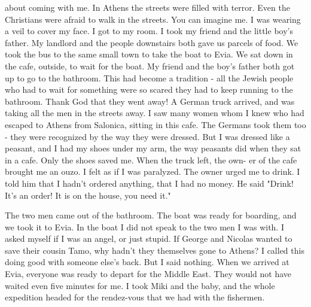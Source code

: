 about coming with me. 
In Athens the streets were filled with terror. Even the Christians 
were afraid to walk in the streets. You can imagine me. I was wearing 
a veil to cover my face. I got to my room. I took my friend and the 
little boy's father. My landlord and the people downstairs both gave 
us parcels of food. We took the bus to the same small town to take the 
boat to Evia. We sat down in the cafe, outside, to wait for the 
boat. My friend and the boy's father both got up to go to the bathroom. 
This had become a tradition - all the Jewish people who had to wait for 
something were so scared they had to keep running to the bathroom.  
Thank God that they went away! 
A German truck arrived, and was taking all the men in the streets 
away. I saw many women whom I knew who had escaped to Athens from Salonica, sitting in this cafe. The Germans took them too - they were 
recognized by the way they were dressed. But I was dressed like a peasant, and I had my shoes under my arm, the way peasants did when they 
sat in a cafe. Only the shoes saved me. When the truck left, the own-
er of the cafe brought me an ouzo. I felt as if I was paralyzed. The 
owner urged me to drink. I told him that I hadn't ordered anything, 
that I had no money. He said "Drink! It's an order! It is on the house, 
you need it." 
 
The two men came out of the bathroom. The boat was ready for boarding, and we took it to Evia. In the boat I did not speak to the two men I was with. I asked myself if I was an angel, or just stupid. If George and Nicolas wanted to save their cousin Tamo, why hadn't 
they themselves gone to Athens? I called this doing good with someone 
else's back. But I said nothing. 
When we arrived at Evia, everyone was ready to depart for the Middle 
East. They would not have waited even five minutes for me. I took Miki 
and the baby, and the whole expedition headed for the rendez-vous that 
we had with the fishermen. 
